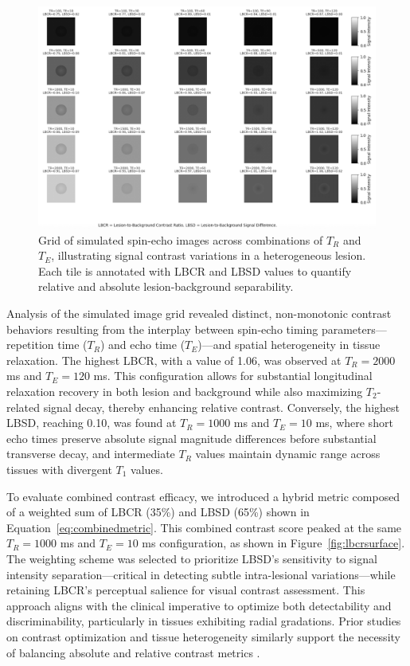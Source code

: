 \documentclass[10pt,a4paper,twoside]{article}
\begin{document}
\begin{figure}[htbp!]
\centering
\includegraphics[width=\textwidth]{figures/lbcrlbsdmatrix.png}
\caption{Grid of simulated spin-echo images across combinations of \( T_R \) and \( T_E \), illustrating signal contrast variations in a heterogeneous lesion. Each tile is annotated with LBCR and LBSD values to quantify relative and absolute lesion-background separability.}
\label{fig:grid}
\end{figure}

Analysis of the simulated image grid revealed distinct, non-monotonic contrast behaviors resulting from the interplay between spin-echo timing parameters—repetition time (\( T_R \)) and echo time (\( T_E \))—and spatial heterogeneity in tissue relaxation. The highest LBCR, with a value of 1.06, was observed at \( T_R = 2000 \) ms and \( T_E = 120 \) ms. This configuration allows for substantial longitudinal relaxation recovery in both lesion and background while also maximizing \( T_2 \)-related signal decay, thereby enhancing relative contrast. Conversely, the highest LBSD, reaching 0.10, was found at \( T_R = 1000 \) ms and \( T_E = 10 \) ms, where short echo times preserve absolute signal magnitude differences before substantial transverse decay, and intermediate \( T_R \) values maintain dynamic range across tissues with divergent \( T_1 \) values.

To evaluate combined contrast efficacy, we introduced a hybrid metric composed of a weighted sum of LBCR (35\%) and LBSD (65\%) shown in Equation~\eqref{eq:combinedmetric}. This combined contrast score peaked at the same \( T_R = 1000 \) ms and \( T_E = 10 \) ms configuration, as shown in Figure~\ref{fig:lbcrsurface}. The weighting scheme was selected to prioritize LBSD’s sensitivity to signal intensity separation—critical in detecting subtle intra-lesional variations—while retaining LBCR’s perceptual salience for visual contrast assessment. This approach aligns with the clinical imperative to optimize both detectability and discriminability, particularly in tissues exhibiting radial gradations. Prior studies on contrast optimization and tissue heterogeneity similarly support the necessity of balancing absolute and relative contrast metrics \cite{tofts2003, does2002, xu2009}.
\end{document}
